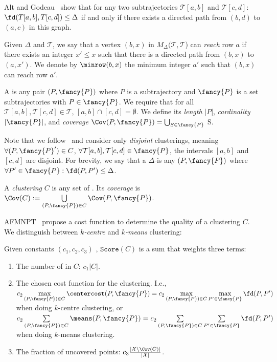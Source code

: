 %
\noindent
Alt and Godeau~\cite{alt1995computing} show that for any two subtrajectories $\mathcal{T}[a, b]$  and $\mathcal{T}[c, d]$: $\fd(T[a, b], T[c, d]) \leq \Delta$ if and only if there exists a directed path from $(b, d)$ to $(a, c)$ in this graph. 
%
\begin{definition}
\label{def:minrow}
    Given $\Delta$ and $\mathcal{T}$, we say that a vertex $(b, x)$ in $M_\Delta(\mathcal{T}, \mathcal{T}$) can \emph{reach} row $a$ if there exists an integer $x' \leq x$ such that there is a directed path from $(b, x)$ to $(a, x')$. We denote by $\minrow(b, x)$ the minimum integer $a'$ such that $(b, x)$ can reach row $a'$. 
    \end{definition}
%
\begin{definition}
    A \pathlet  is any pair $(P, {\fancy{P}})$ where $P$ is a subtrajectory and ${\fancy{P}}$ is a set subtrajectories with $P \in {\fancy{P}}$. We require that for all $\mathcal{T}[a, b], \mathcal{T}[c, d] \in \mathcal{T}$, $[a, b] \cap [c, d] = \emptyset$.     
    We define its \emph{length} $|P|$, \emph{cardinality} $|{\fancy{P}}|$, and \emph{coverage} $\Cov(P, {\fancy{P}}) =  \bigcup_{S \in {\fancy{P}}}$ S. 
\end{definition}
%
%
%
\noindent
Note that we follow~\cite{agarwal2018subtrajectory, buchin2017clustering, buchin2020improved, buchin2011detecting} and consider only \emph{disjoint} clusterings, meaning $\forall (P, {\fancy{P}}') \in C$, $\forall \mathcal{T}[a, b], \mathcal{T}[c, d] \in {\fancy{P}}$, the intervals $[a, b]$ and $[c, d]$ are disjoint.
For brevity, we say that a $\Delta$-\pathlet is any \pathlet $(P, {\fancy{P}})$ where $\forall P' \in {\fancy{P}} : \fd(P, P') \leq \Delta$.
%
\begin{definition}
A \emph{clustering} $C$ is any set of \pathlets. 
Its \emph{coverage} is $\Cov(C) := \bigcup\limits_{(P, {\fancy{P}}) \in C} \Cov(P, {\fancy{P}})$. 
\end{definition}
%
%
\noindent
AFMNPT~\cite{agarwal2018subtrajectory} propose a cost function to determine the quality of a clustering $C$.
We distinguish between \emph{$k$-centre} and \emph{$k$-means} clustering: 
%
\begin{definition}
\label{def:score}
Given constants $(c_1, c_2, c_3)$ , 
$\texttt{Score}(C)$ is a sum that weights three terms:
    \begin{enumerate}
    \item The number of \pathlets in $C$: $c_1 |C|$.
\item The chosen cost function for the clustering. I.e.,
%
    $c_2 \max\limits_{(P, {\fancy{P}}) \in C} \centercost(P, {\fancy{P}}) = c_2 \max\limits_{(P, {\fancy{P}}) \in C} \max\limits_{P' \in {\fancy{P}}} \fd(P, P')$ when doing $k$-centre clustering, or 
%
         $c_2 \sum\limits_{(P, {\fancy{P}}) \in C} \means(P, {\fancy{P}})  = c_2 \sum\limits_{(P, {\fancy{P}}) \in C} \sum\limits_{P' \in {\fancy{P}}} \fd(P, P')$ when doing $k$-means clustering. 
\item The fraction of uncovered points: $c_3 \frac{| \mathcal{X} \backslash \Cov(C) |}{|\mathcal{X}|}$.
\end{enumerate}
\end{definition}
